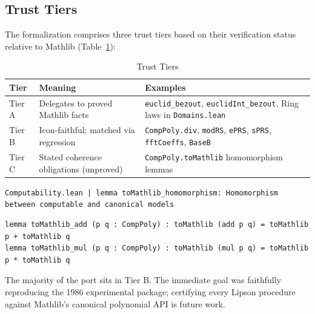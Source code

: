 \documentclass[11pt,a4paper]{article}
\begin{document}
\subsection{Trust Tiers}
The formalization comprises three trust tiers based on their verification status relative to Mathlib (Table~\ref{tab:tiers}):

\begin{table}[htbp]
\centering
\caption{Trust Tiers}
\label{tab:tiers}
\small
\begin{tabularx}{\textwidth}{@{}l>{\raggedright\arraybackslash}X>{\raggedright\arraybackslash}X@{}}
\toprule
\textbf{Tier} & \textbf{Meaning} & \textbf{Examples} \\
\midrule
Tier A & Delegates to proved Mathlib facts & \texttt{euclid\_bezout}, \texttt{euclidInt\_bezout}, Ring laws in \texttt{Domains.lean} \\
Tier B & Icon-faithful; matched via regression & \texttt{CompPoly.div}, \texttt{modRS}, \texttt{ePRS}, \texttt{sPRS}, \texttt{fftCoeffs}, \texttt{BaseB} \\
Tier C & Stated coherence obligations (unproved) & \texttt{CompPoly.toMathlib} homomorphism lemmas \\
\bottomrule
\end{tabularx}
\end{table}

\begin{leanfuturebox}
\lstinline[style=leanbox]{Computability.lean | lemma toMathlib_homomorphism: Homomorphism between computable and canonical models}
\begin{lstlisting}[style=leanbox]
lemma toMathlib_add (p q : CompPoly) : toMathlib (add p q) = toMathlib p + toMathlib q
lemma toMathlib_mul (p q : CompPoly) : toMathlib (mul p q) = toMathlib p * toMathlib q
\end{lstlisting}
\end{leanfuturebox}

The majority of the port sits in Tier B. The immediate goal was faithfully reproducing the 1986 experimental package; certifying every Lipson procedure against Mathlib's canonical polynomial API is future work.
\end{document}
